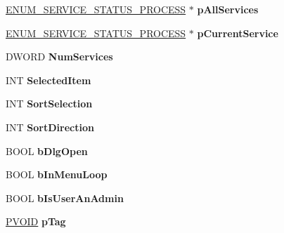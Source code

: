 \begin{DoxyCompactItemize}
\hyperlink{struct___e_n_u_m___s_e_r_v_i_c_e___s_t_a_t_u_s___p_r_o_c_e_s_s_a}{E\+N\+U\+M\+\_\+\+S\+E\+R\+V\+I\+C\+E\+\_\+\+S\+T\+A\+T\+U\+S\+\_\+\+P\+R\+O\+C\+E\+SS} $\ast$ {\bfseries p\+All\+Services}
\item 
\mbox{\label{struct___m_a_i_n___w_n_d___i_n_f_o_aa2b02e4376a1fa8920aa41a848933462}} 
\hyperlink{struct___e_n_u_m___s_e_r_v_i_c_e___s_t_a_t_u_s___p_r_o_c_e_s_s_a}{E\+N\+U\+M\+\_\+\+S\+E\+R\+V\+I\+C\+E\+\_\+\+S\+T\+A\+T\+U\+S\+\_\+\+P\+R\+O\+C\+E\+SS} $\ast$ {\bfseries p\+Current\+Service}
\item 
\mbox{\label{struct___m_a_i_n___w_n_d___i_n_f_o_ab2ecb07cd0a43404e55e081dc06df02c}} 
D\+W\+O\+RD {\bfseries Num\+Services}
\item 
\mbox{\label{struct___m_a_i_n___w_n_d___i_n_f_o_a2de7d99fa5bd90abab439f08977fedf2}} 
I\+NT {\bfseries Selected\+Item}
\item 
\mbox{\label{struct___m_a_i_n___w_n_d___i_n_f_o_af4c8a7edc03e257811cc3a33b1bf635d}} 
I\+NT {\bfseries Sort\+Selection}
\item 
\mbox{\label{struct___m_a_i_n___w_n_d___i_n_f_o_aed0f99a11a4eb75049acbcecb6631d43}} 
I\+NT {\bfseries Sort\+Direction}
\item 
\mbox{\label{struct___m_a_i_n___w_n_d___i_n_f_o_a6526a0a6564a03cfec07ffc1601e40ba}} 
B\+O\+OL {\bfseries b\+Dlg\+Open}
\item 
\mbox{\label{struct___m_a_i_n___w_n_d___i_n_f_o_af394269de7921a7b8379a41400284316}} 
B\+O\+OL {\bfseries b\+In\+Menu\+Loop}
\item 
\mbox{\label{struct___m_a_i_n___w_n_d___i_n_f_o_ab9ccd70da4dd7ab86a3e12f9ffa2c4f3}} 
B\+O\+OL {\bfseries b\+Is\+User\+An\+Admin}
\item 
\mbox{\label{struct___m_a_i_n___w_n_d___i_n_f_o_a13ea16ac52a08e02641c5e7e3b4b33e6}} 
\hyperlink{interfacevoid}{P\+V\+O\+ID} {\bfseries p\+Tag}

\end{DoxyCompactItemize}

